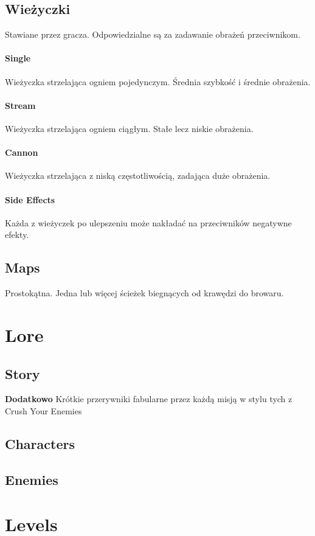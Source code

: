 \documentclass[12pt]{article}
\begin{document}
\subsection{Wieżyczki}
	Stawiane przez gracza. Odpowiedzialne są za zadawanie obrażeń przeciwnikom.
\paragraph{Single}
	Wieżyczka strzelająca ogniem pojedynczym. Średnia szybkość i średnie obrażenia.
\paragraph{Stream}
	Wieżyczka strzelająca ogniem ciągłym. Stałe lecz niskie obrażenia.
\paragraph{Cannon}
	Wieżyczka strzelająca z niską częstotliwością, zadająca duże obrażenia.
\paragraph{Side Effects}
	Każda z wieżyczek po ulepszeniu może nakładać na przeciwników negatywne efekty.
\subsection{Maps}
	Prostokątna. Jedna lub więcej ścieżek biegnących od krawędzi do browaru.

\newpage
\section{Lore}
\subsection{Story}

	\textbf{Dodatkowo}
	Krótkie przerywniki fabularne przez każdą misją w stylu tych z Crush Your Enemies
\subsection{Characters}
\subsection{Enemies}

\newpage
\section{Levels}
\end{document}
